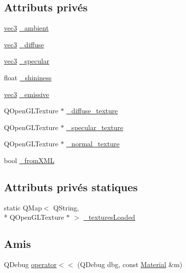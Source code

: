 \subsection*{Attributs privés}
\begin{DoxyCompactItemize}
\item 
\hyperlink{structvec3}{vec3} \hyperlink{class_material_a4c29044a3f7e8008eb3a0666c4ce09b9}{\+\_\+ambient}
\item 
\hyperlink{structvec3}{vec3} \hyperlink{class_material_a402005729d7d5a147d51dfcd691d2ffa}{\+\_\+diffuse}
\item 
\hyperlink{structvec3}{vec3} \hyperlink{class_material_af3e2839f5a712fba28111e00783af70f}{\+\_\+specular}
\item 
float \hyperlink{class_material_ae3f666b9de93b770232ebb5b1b3ee47e}{\+\_\+shininess}
\item 
\hyperlink{structvec3}{vec3} \hyperlink{class_material_a7c2eb5e499b3f46ec6e9d62f02653879}{\+\_\+emissive}
\item 
Q\+Open\+G\+L\+Texture $\ast$ \hyperlink{class_material_a522d07896a1363e987d09d8e4b66c156}{\+\_\+diffuse\+\_\+texture}
\item 
Q\+Open\+G\+L\+Texture $\ast$ \hyperlink{class_material_a15711d6d794b6ea122e38738fa73ba8a}{\+\_\+specular\+\_\+texture}
\item 
Q\+Open\+G\+L\+Texture $\ast$ \hyperlink{class_material_add78622071d92485dd37dbd1934453b3}{\+\_\+normal\+\_\+texture}
\item 
bool \hyperlink{class_material_a3a262cfbb40e19f79b29c61386e76f95}{\+\_\+from\+X\+M\+L}
\end{DoxyCompactItemize}
\subsection*{Attributs privés statiques}
\begin{DoxyCompactItemize}
\item 
static Q\+Map$<$ Q\+String, \\*
Q\+Open\+G\+L\+Texture $\ast$ $>$ \hyperlink{class_material_a9f91b9fda835fed049df5c6959043623}{\+\_\+textures\+Loaded}
\end{DoxyCompactItemize}
\subsection*{Amis}
\begin{DoxyCompactItemize}
\item 
Q\+Debug \hyperlink{class_material_a6796ee577479f67459444fcd552e6c05}{operator$<$$<$} (Q\+Debug dbg, const \hyperlink{class_material}{Material} \&m)
\end{DoxyCompactItemize}


